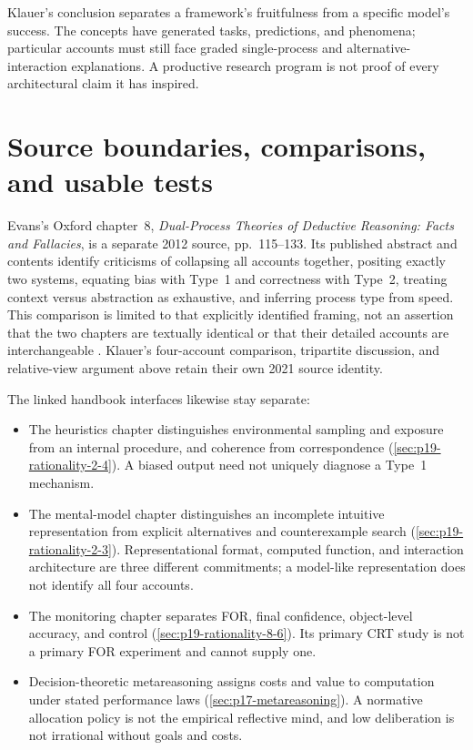 Klauer's conclusion separates a framework's fruitfulness from a specific
model's success. The concepts have generated tasks, predictions, and
phenomena; particular accounts must still face graded single-process
and alternative-interaction explanations. A productive research program
is not proof of every architectural claim it has inspired.

\section{Source boundaries, comparisons, and usable tests}

Evans's Oxford chapter~8, \emph{Dual-Process Theories of Deductive
Reasoning: Facts and Fallacies}, is a separate 2012 source, pp.~115--133.
Its published abstract and contents identify criticisms of collapsing
all accounts together, positing exactly two systems, equating bias with
Type~1 and correctness with Type~2, treating context versus abstraction
as exhaustive, and inferring process type from speed. This comparison is
limited to that explicitly identified framing, not an assertion that
the two chapters are textually identical or that their detailed accounts
are interchangeable \cite{Evans2012DualProcessFactsFallacies}.
Klauer's four-account comparison, tripartite discussion, and relative-view
argument above retain their own 2021 source identity.

The linked handbook interfaces likewise stay separate:
\begin{itemize}
\item The heuristics chapter distinguishes environmental sampling and
      exposure from an internal procedure, and coherence from correspondence
      (\cref{sec:p19-rationality-2-4}). A biased output need not uniquely
      diagnose a Type~1 mechanism.
\item The mental-model chapter distinguishes an incomplete intuitive
      representation from explicit alternatives and counterexample search
      (\cref{sec:p19-rationality-2-3}). Representational format, computed
      function, and interaction architecture are three different commitments;
      a model-like representation does not identify all four accounts.
\item The monitoring chapter separates FOR, final confidence, object-level
      accuracy, and control (\cref{sec:p19-rationality-8-6}). Its primary
      CRT study is not a primary FOR experiment and cannot supply one.
\item Decision-theoretic metareasoning assigns costs and value to
      computation under stated performance laws (\cref{sec:p17-metareasoning}).
      A normative allocation policy is not the empirical reflective mind,
      and low deliberation is not irrational without goals and costs.
\end{itemize}


